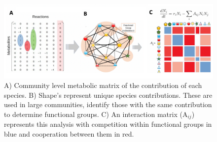 \documentclass[11pt, onehalfspacing]{article}
\begin{document}
\begin{figure}[H]
	\includegraphics[width=\linewidth]{figure2.png}
	\caption{A) Community level metabolic matrix of the contribution of each species. B) Shape's represent unique species contributions. These are used in large communities, identify those with the same contribution to determine functional groups. C) An interaction matrix (A$_{ij}$) represents this analysis with competition within functional groups in blue and cooperation between them in red.}
	\label{fig2}
\end{figure}


\end{document}
